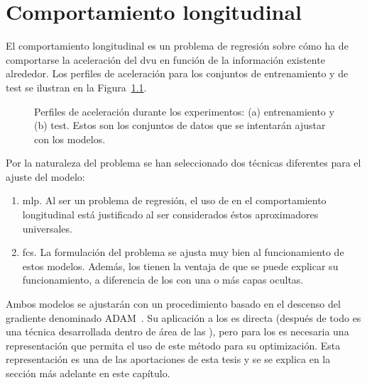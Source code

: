 \chapter{Comportamiento longitudinal}
\label{ch:longitudinal-model}

El comportamiento longitudinal es un problema de regresión sobre cómo ha de comportarse la aceleración del \gls{dvu} en función de la información existente alrededor. Los perfiles de aceleración para los conjuntos de entrenamiento y de test se ilustran en la Figura~\ref{fig:acceleration-profiles}.

\begin{figure}
	\centering
	\qquad
	\caption[Perfiles de aceleración a ajustar por los modelos. Conjuntos de entrenamiento y de test]{Perfiles de aceleración durante los experimentos: (a) entrenamiento y (b) test. Estos son los conjuntos de datos que se intentarán ajustar con los modelos.}
	\label{fig:acceleration-profiles}
\end{figure}

Por la naturaleza del problema se han seleccionado dos técnicas diferentes para el ajuste del modelo:

\begin{enumerate}
	\item \Acrshort{mlp}. Al ser un problema de regresión, el uso de  en el comportamiento longitudinal está justificado al ser considerados éstos aproximadores universales.
	\item \Acrshort{fcs}. La formulación del problema se ajusta muy bien al funcionamiento de estos modelos. Además, los  tienen la ventaja de que se puede explicar su funcionamiento, a diferencia de los  con una o más capas ocultas.
\end{enumerate}

Ambos modelos se ajustarán con un procedimiento basado en el descenso del gradiente denominado ADAM~\cite{kingma2014adam}. Su aplicación a los  es directa (después de todo es una técnica desarrollada dentro de área de las ), pero para los  es necesaria una representación que permita el uso de este método para su optimización. Esta representación es una de las aportaciones de esta tesis y se se explica en la sección  más adelante en este capítulo.

